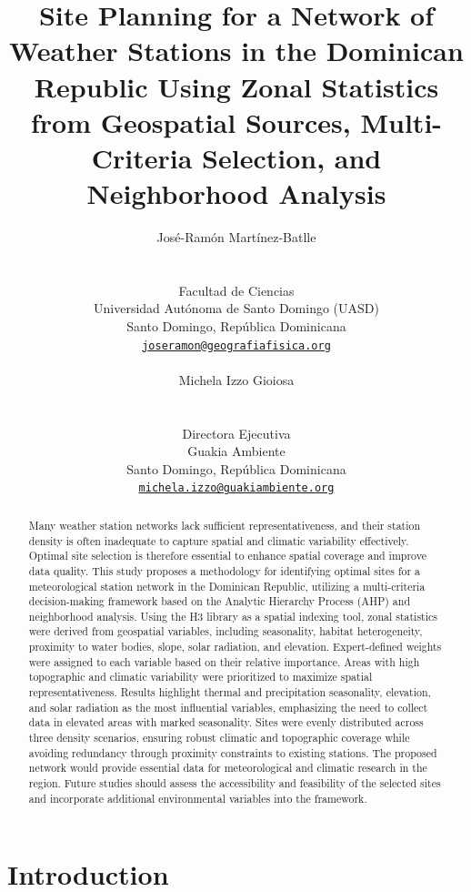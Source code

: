 \documentclass[spanish]{article}
\title{Site Planning for a Network of Weather Stations in the Dominican
Republic Using Zonal Statistics from Geospatial Sources, Multi-Criteria
Selection, and Neighborhood Analysis}
\author{
    \parbox[t]{10cm}{\centering José-Ramón Martínez-Batlle \\ \orcidlink{0000-0001-9924-0327}}
   \\
    Facultad de Ciencias \\
    Universidad Autónoma de Santo Domingo (UASD) \\
  Santo Domingo, República Dominicana \\
  \texttt{\href{mailto:joseramon@geografiafisica.org}{\nolinkurl{joseramon@geografiafisica.org}}} \\
   \And
    \parbox[t]{10cm}{\centering Michela Izzo Gioiosa \\ \orcidlink{0000-0003-4835-3967}}
   \\
    Directora Ejecutiva \\
    Guakia Ambiente \\
  Santo Domingo, República Dominicana \\
  \texttt{\href{mailto:michela.izzo@guakiambiente.org}{\nolinkurl{michela.izzo@guakiambiente.org}}} \\
  }
\begin{document}
\maketitle


\begin{resumen}

\end{resumen}



\begin{abstract}
Many weather station networks lack sufficient representativeness, and
their station density is often inadequate to capture spatial and
climatic variability effectively. Optimal site selection is therefore
essential to enhance spatial coverage and improve data quality. This
study proposes a methodology for identifying optimal sites for a
meteorological station network in the Dominican Republic, utilizing a
multi-criteria decision-making framework based on the Analytic Hierarchy
Process (AHP) and neighborhood analysis. Using the H3 library as a
spatial indexing tool, zonal statistics were derived from geospatial
variables, including seasonality, habitat heterogeneity, proximity to
water bodies, slope, solar radiation, and elevation. Expert-defined
weights were assigned to each variable based on their relative
importance. Areas with high topographic and climatic variability were
prioritized to maximize spatial representativeness. Results highlight
thermal and precipitation seasonality, elevation, and solar radiation as
the most influential variables, emphasizing the need to collect data in
elevated areas with marked seasonality. Sites were evenly distributed
across three density scenarios, ensuring robust climatic and topographic
coverage while avoiding redundancy through proximity constraints to
existing stations. The proposed network would provide essential data for
meteorological and climatic research in the region. Future studies
should assess the accessibility and feasibility of the selected sites
and incorporate additional environmental variables into the framework.
\end{abstract}


\hypertarget{introduction}{%
\section{Introduction}\label{introduction}}
\end{document}
